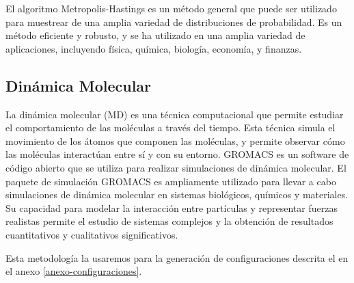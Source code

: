 El algoritmo Metropolis-Hastings es un m\'etodo general que puede ser utilizado para muestrear de una amplia variedad de distribuciones de probabilidad. Es un m\'etodo eficiente y robusto, y se ha utilizado en una amplia variedad de aplicaciones, incluyendo f\'isica, qu\'imica, biolog\'ia, econom\'ia, y finanzas.\cite{sin2020applications}

\subsection{Din\'amica Molecular}

La din\'amica molecular (MD) es una t\'ecnica computacional que permite estudiar el comportamiento de las mol\'eculas a trav\'es del tiempo. Esta t\'ecnica simula el movimiento de los \'atomos que componen las mol\'eculas, y permite observar c\'omo las mol\'eculas interact\'uan entre s\'i y con su entorno.
GROMACS es un software de c\'odigo abierto que se utiliza para realizar simulaciones de din\'amica molecular. \cite{lindahl2001gromacs}
El paquete de simulaci\'on GROMACS es ampliamente utilizado para llevar a cabo simulaciones de din\'amica molecular en sistemas biol\'ogicos, qu\'imicos y materiales. Su capacidad para modelar la interacci\'on entre part\'iculas y representar fuerzas realistas permite el estudio de sistemas complejos y la obtenci\'on de resultados cuantitativos y cualitativos significativos.

Esta metodolog\'ia la usaremos para la generaci\'on de configuraciones descrita el en el anexo \ref{anexo-configuraciones}.






